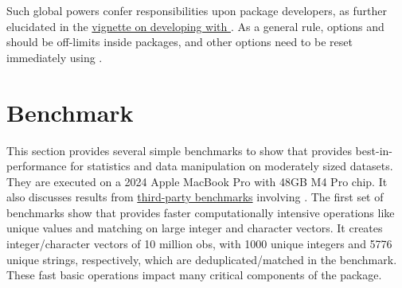 \documentclass[article]{jss} %
\newcommand{\fct}[1]{\code{#1()}}
\begin{document}
Such global powers confer responsibilities upon package developers, as further elucidated in the \href{https://sebkrantz.github.io/collapse/articles/developing_with_collapse.html#some-notes-on-global-options}{vignette on developing with }. As a general rule, options  and  should be off-limits inside packages, and other options need to be reset immediately using \fct{on.exit}.
%
\section{Benchmark} \label{sec:bench}
%
This section provides several simple benchmarks to show that  provides best-in- performance for statistics and data manipulation on moderately sized datasets. They are executed on a 2024 Apple MacBook Pro with 48GB M4 Pro chip. It also discusses results from \href{https://github.com/fastverse/fastverse/wiki/Benchmarks}{third-party benchmarks} involving . The first set of benchmarks show that  provides faster computationally intensive operations like unique values and matching on large integer and character vectors. It creates integer/character vectors of 10 million obs, with 1000 unique integers and 5776 unique strings, respectively, which are deduplicated/matched in the benchmark. These fast basic operations impact many critical components of the package. %
%
\end{document}
